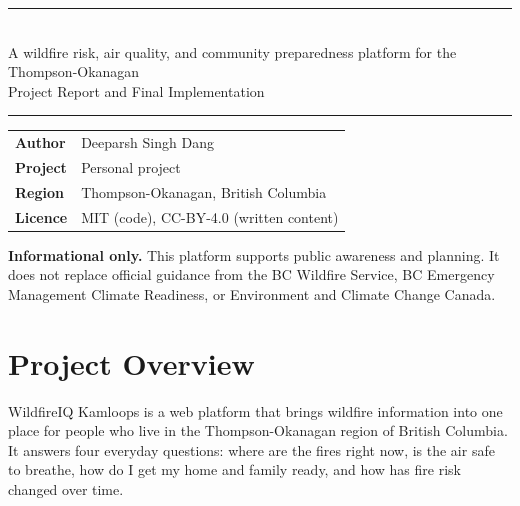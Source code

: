\documentclass[11pt]{article}
\newcommand{\callout}[1]{%
  \par\medskip\noindent
  \colorbox{mist}{\parbox{\dimexpr\linewidth-2\fboxsep}{\color{ink}\small #1}}%
  \par\medskip}
\begin{document}
\begin{titlepage}
\thispagestyle{empty}
\color{ink}
\vspace*{1.2cm}

{\noindent\color{ember}\rule{\linewidth}{2.5pt}}
\vspace{0.8cm}

\\[0.5cm]
{\noindent\LARGE A wildfire risk, air quality, and community preparedness platform for the Thompson-Okanagan}\\[0.6cm]

{\noindent\large\color{slate} Project Report and Final Implementation}

\vspace{0.6cm}
{\noindent\color{ember}\rule{\linewidth}{1pt}}

\vspace{2.2cm}
\noindent
\begin{tabular}{@{}ll@{}}
{\bfseries Author} & Deeparsh Singh Dang \\[0.3em]
{\bfseries Project} & Personal project \\[0.3em]
{\bfseries Region} & Thompson-Okanagan, British Columbia \\[0.3em]
{\bfseries Licence} & MIT (code), CC-BY-4.0 (written content) \\
\end{tabular}

\vfill
\callout{\textbf{Informational only.} This platform supports public awareness and planning. It does not replace official guidance from the BC Wildfire Service, BC Emergency Management Climate Readiness, or Environment and Climate Change Canada.}

\end{titlepage}

\newpage
\tableofcontents
\newpage

\section{Project Overview}

WildfireIQ Kamloops is a web platform that brings wildfire information into one
place for people who live in the Thompson-Okanagan region of British Columbia.
It answers four everyday questions: where are the fires right now, is the air
safe to breathe, how do I get my home and family ready, and how has fire risk
changed over time.
\end{document}
